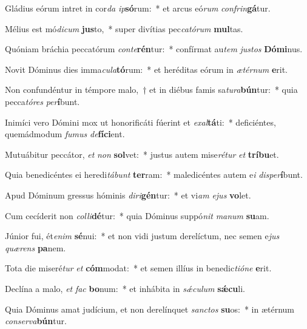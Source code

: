 \item Gládius eórum intret in cor\textit{da} \textit{ip}\textbf{só}rum:~* et arcus eó\textit{rum} \textit{con}\textit{frin}\textbf{gá}tur.
\item Mélius est mó\textit{di}\textit{cum} \textbf{jus}to,~* super divítias pec\textit{ca}\textit{tó}\textit{rum} \textbf{mul}tas.
\item Quóniam bráchia peccatórum \textit{con}\textit{te}\textbf{rén}tur:~* confírmat au\textit{tem} \textit{jus}\textit{tos} \textbf{Dó}\textbf{mi}nus.
\item Novit Dóminus dies imma\textit{cu}\textit{la}\textbf{tó}rum:~* et heréditas eórum in \textit{æ}\textit{tér}\textit{num} \textbf{e}rit.
\item Non confundéntur in témpore malo,~† et in diébus famis sa\textit{tu}\textit{ra}\textbf{bún}tur:~* quia pecca\textit{tó}\textit{res} \textit{per}\textbf{í}bunt.
\item Inimíci vero Dómini mox ut honorificáti fúerint et \textit{ex}\textit{al}\textbf{tá}ti:~* deficiéntes, quemádmodum \textit{fu}\textit{mus} \textit{de}\textbf{fí}\textbf{ci}ent.
\item Mutuábitur peccátor, \textit{et} \textit{non} \textbf{sol}vet:~* justus autem mise\textit{ré}\textit{tur} \textit{et} \textbf{trí}\textbf{bu}et.
\item Quia benedicéntes ei heredi\textit{tá}\textit{bunt} \textbf{ter}ram:~* maledicéntes autem e\textit{i} \textit{dis}\textit{per}\textbf{í}bunt.
\item Apud Dóminum gressus hóminis \textit{di}\textit{ri}\textbf{gén}tur:~* et vi\textit{am} \textit{e}\textit{jus} \textbf{vo}let.
\item Cum cecíderit non \textit{col}\textit{li}\textbf{dé}tur:~* quia Dóminus suppó\textit{nit} \textit{ma}\textit{num} \textbf{su}am.
\item Júnior fui, ét\textit{e}\textit{nim} \textbf{sé}nui:~* et non vidi justum derelíctum, nec semen e\textit{jus} \textit{quæ}\textit{rens} \textbf{pa}nem.
\item Tota die miseré\textit{tur} \textit{et} \textbf{cóm}modat:~* et semen illíus in benedic\textit{ti}\textit{ó}\textit{ne} \textbf{e}rit.
\item Declína a malo, \textit{et} \textit{fac} \textbf{bo}num:~* et inhábita in \textit{sǽ}\textit{cu}\textit{lum} \textbf{sǽ}\textbf{cu}li.
\item Quia Dóminus amat judícium, et non derelínquet \textit{sanc}\textit{tos} \textbf{su}os:~* in ætérnum \textit{con}\textit{ser}\textit{va}\textbf{bún}tur.
